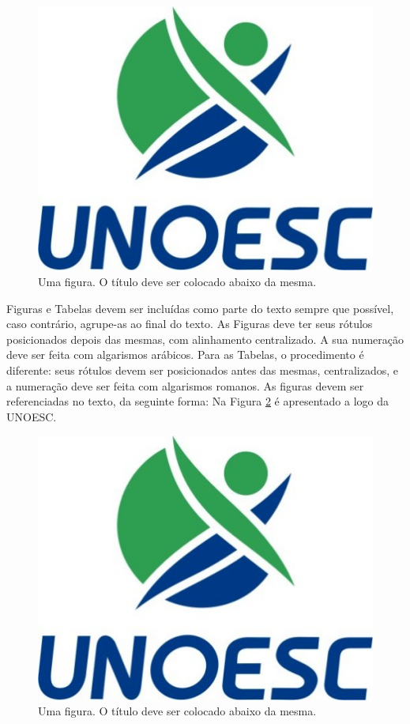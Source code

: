 \begin{figure}[h]
    \centering
    \includegraphics{figuras/unoesc.jpg}
    \caption{Uma figura. O título deve ser colocado abaixo da mesma.}
    \label{fig:unoesc}
\end{figure}

Figuras e Tabelas devem ser incluídas como parte do texto sempre que possível, caso contrário, agrupe-as ao final do texto. As Figuras deve ter seus rótulos posicionados depois das mesmas, com alinhamento centralizado. A sua numeração deve ser feita com algarismos arábicos. Para as Tabelas, o procedimento é diferente: seus rótulos devem ser posicionados antes das mesmas, centralizados, e a numeração deve ser feita com algarismos romanos. As figuras devem ser referenciadas no texto, da seguinte forma: Na Figura \ref{fig:unoesc} é apresentado a logo da UNOESC.

\begin{figure}[h]
    \centering
    \includegraphics{figuras/unoesc.jpg}
    \caption{Uma figura. O título deve ser colocado abaixo da mesma.}
    \label{fig:unoesc}
\end{figure}




